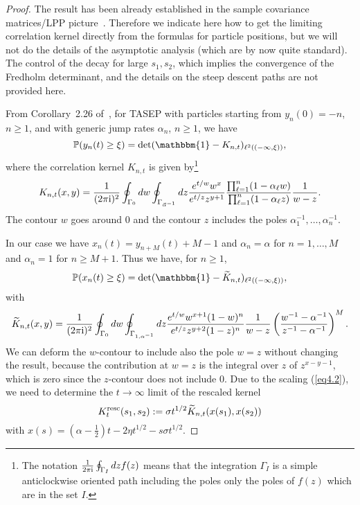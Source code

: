 \documentclass[12pt,a4paper]{article}
\numberwithin{equation}{section}
\newcommand{\Pb}{\mathbb{P}}
\newcommand{\Id}{\mathbbm{1}}
\newcommand{\I}{{\rm i}}
\begin{document}
\begin{proof}
The result has been already established in the sample covariance matrices/LPP picture~\cite{BBP06}. Therefore we indicate here how to get the limiting correlation kernel directly from the formulas for particle positions, but we will not do the details of the asymptotic analysis (which are by now quite standard). The control of the decay for large $s_1,s_2$, which implies the convergence of the Fredholm determinant, and the details on the steep descent paths are not provided here.

From Corollary~2.26 of~\cite{BF08}, for TASEP with particles starting from $y_n(0)=-n$, $n\geq 1$, and with generic jump rates $\alpha_n$, $n\geq 1$, we have
\begin{equation}
\Pb(y_n(t)\geq \xi)=\det(\Id-K_{n,t})_{\ell^2((-\infty,\xi))},
\end{equation}
where the correlation kernel $K_{n,t}$ is given by\footnote{The notation $\frac{1}{2\pi\I}\oint_{\Gamma_I}dz f(z)$ means that the integration $\Gamma_I$ is a simple anticlockwise oriented path including the poles only the poles of $f(z)$ which are in the set $I$.}
\begin{equation}
K_{n,t}(x,y)=\frac{1}{(2\pi\I)^2}\oint_{\Gamma_0}dw \oint_{\Gamma_{\vec \alpha^{-1}}} dz \frac{e^{t/w} w^x}{e^{t/z} z^{y+1}}\frac{\prod_{\ell=1}^n (1-\alpha_\ell w)}{ \prod_{\ell=1}^n (1-\alpha_\ell z)}\frac{1}{w-z}.
\end{equation}
The contour $w$ goes around $0$ and the contour $z$ includes the poles $\alpha_1^{-1},\ldots,\alpha_n^{-1}$.

In our case we have $x_n(t)=y_{n+M}(t)+M-1$ and $\alpha_n=\alpha$ for $n=1,\ldots,M$ and $\alpha_n=1$ for $n\geq M+1$. Thus we have, for $n\geq 1$,
\begin{equation}
\Pb(x_n(t)\geq \xi)=\det(\Id-\widetilde K_{n,t})_{\ell^2((-\infty,\xi))},
\end{equation}
with
\begin{equation}
\begin{aligned}
\widetilde K_{n,t}(x,y)=\frac{1}{(2\pi\I)^2}\oint_{\Gamma_0}dw \oint_{\Gamma_{1,\alpha^{-1}}} dz \frac{e^{t/w} w^{x+1} (1-w)^n}{e^{t/z} z^{y+2} (1-z)^n}\frac{1}{w-z}\left(\frac{w^{-1}-\alpha^{-1}}{z^{-1}-\alpha^{-1}}\right)^M.
\end{aligned}
\end{equation}
We can deform the $w$-contour to include also the pole $w=z$ without changing the result, because the contribution at $w=z$ is the integral over $z$ of $z^{x-y-1}$, which is zero since the $z$-contour does not include $0$.
Due to the scaling (\ref{eq4.2}), we need to determine the $t\to\infty$ limit of the rescaled kernel
\begin{equation}
K^{\rm resc}_t(s_1,s_2):=\sigma t^{1/2} \widetilde K_{n,t}(x(s_1),x(s_2))
\end{equation}
with $x(s)=(\alpha-\tfrac12)t-2\eta t^{1/2}-s \sigma t^{1/2}$.


\end{proof}
\end{document}
